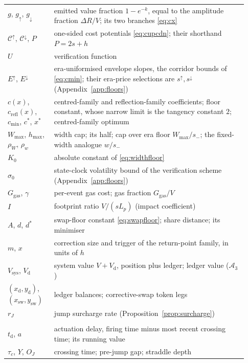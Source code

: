 \documentclass[11pt,a4paper]{article}
\theoremstyle{definition}
\theoremstyle{plain}
\theoremstyle{remark}
\newcommand{\tact}{t_{\mathrm{d}}}
\begin{document}
\begin{longtable}{@{}>{\centering\arraybackslash}p{0.18\linewidth}p{0.75\linewidth}@{}}
$g$, $g_{\uparrow}$, $g_{\downarrow}$ & emitted value fraction $1 -
e^{-k}$, equal to the amplitude fraction $\Delta R/V$; its two
branches \eqref{eq:cx} \\
$\mathcal{C}^{\uparrow}$, $\mathcal{C}^{\downarrow}$, $P$ &
one-sided cost potentials \eqref{eq:cupcdn}; their shorthand $P = 2s
+ h$ \\
$U$ & verification function \\
$E^{\uparrow}$, $E^{\downarrow}$ & era-uniformised envelope slopes,
the corridor bounds of \eqref{eq:cmin}; their era-price selections
are $s^{\uparrow}, s^{\downarrow}$ (Appendix~\ref{app:floors}) \\
$c(x)$, $c_{\mathrm{refl}}(x)$, $c_{\min}$, $c^*$, $x^*$ &
centred-family and reflection-family coefficients; floor constant,
whose narrow limit is the tangency constant $2$; centred-family
optimum \\
$W_{\max}$, $h_{\max}$, $\rho_W$, $\rho_w$ & width cap;
its half; cap over era floor $W_{\max}/s_-$; the fixed-width
analogue $w/s_-$ \\
$K_0$ & absolute constant of \eqref{eq:widthfloor} \\
$\sigma_0$ & state-clock volatility bound of the verification
scheme (Appendix~\ref{app:floors}) \\
$G_{\mathrm{gas}}$, $\gamma$ & per-event gas cost; gas fraction
$G_{\mathrm{gas}}/V$ \\
$I$ & footprint ratio $V/(s L_p)$ (impact coefficient) \\
$A$, $d$, $d^*$ & swap-floor constant \eqref{eq:swapfloor}; share
distance; its minimiser \\
$m$, $x$ & correction size and trigger of the return-point family,
in units of $h$ \\
$V_{\mathrm{sys}}$, $V_{\mathrm{d}}$ & system value $V +
V_{\mathrm{d}}$, position plus ledger; ledger value ($\mathcal{A}_3$) \\
$(x_{\mathrm{d}}, y_{\mathrm{d}})$,
$(x_{\mathrm{sw}}, y_{\mathrm{sw}})$ & ledger balances;
corrective-swap token legs \\
$r_J$ & jump surcharge rate (Proposition~\ref{prop:surcharge}) \\
\midrule
\multicolumn{2}{@{}l}{\emph{The instrument (third act)}} \\
$\tact$, $a$ & actuation delay, firing time minus most recent
crossing time; its running value \\
$\tau_c$, $Y$, $O_J$ & crossing time; pre-jump gap; straddle depth \\

\end{longtable}
\end{document}
